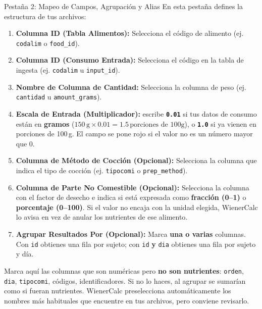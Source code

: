 \documentclass[11pt,a4paper]{article}
\begin{document}
\begin{stepcard}{Pestaña 2: Mapeo de Campos, Agrupación y Alias}
En esta pestaña defines la estructura de tus archivos:
\begin{enumerate}[leftmargin=*]
    \item \textbf{Columna ID (Tabla Alimentos):} Selecciona el código de alimento (ej. \texttt{codalim} o \texttt{food\_id}).
    \item \textbf{Columna ID (Consumo Entrada):} Selecciona el código en la tabla de ingesta (ej. \texttt{codalim} u \texttt{input\_id}).
    \item \textbf{Nombre de Columna de Cantidad:} Selecciona la columna de peso (ej. \texttt{cantidad} u \texttt{amount\_grams}).
    \item \textbf{Escala de Entrada (Multiplicador):} escribe \textbf{\texttt{0.01}} si tus datos de consumo están en \textbf{gramos} ($150\,\text{g} \times 0.01 = 1.5\,\text{porciones de 100g}$), o \textbf{\texttt{1.0}} si ya vienen en porciones de 100\,g. El campo se pone rojo si el valor no es un número mayor que 0.
    \item \textbf{Columna de Método de Cocción (Opcional):} Selecciona la columna que indica el tipo de cocción (ej. \texttt{tipocomi} o \texttt{prep\_method}).
    \item \textbf{Columna de Parte No Comestible (Opcional):} Selecciona la columna con el factor de desecho e indica si está expresada como \textbf{fracción (0--1)} o \textbf{porcentaje (0--100)}. Si el valor no encaja con la unidad elegida, WienerCalc lo avisa en vez de anular los nutrientes de ese alimento.
    \item \textbf{Agrupar Resultados Por (Opcional):} Marca \textbf{una o varias} columnas. Con \texttt{id} obtienes una fila por sujeto; con \texttt{id} \textbf{y} \texttt{dia} obtienes una fila por sujeto y día.
\end{enumerate}

\begin{glassbox}
Marca aquí las columnas que son numéricas pero \textbf{no son nutrientes}: \texttt{orden}, \texttt{dia}, \texttt{tipocomi}, códigos, identificadores. Si no lo haces, al agrupar se sumarían como si fueran nutrientes. WienerCalc preselecciona automáticamente los nombres más habituales que encuentre en tus archivos, pero conviene revisarlo.
\end{glassbox}


\end{stepcard}
\end{document}
